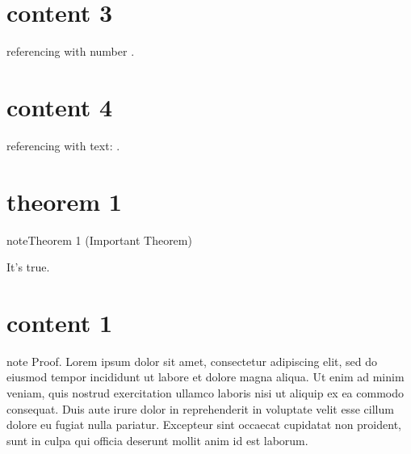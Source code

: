 \sphinxstepscope


\chapter{content 3}
\label{\detokenize{algorithm/_algo_numbered_reference:content-3}}\label{\detokenize{algorithm/_algo_numbered_reference::doc}}
\sphinxAtStartPar
referencing with number {\hyperref[\detokenize{algorithm/_algo_labeled_titled_with_classname:test-algo-label}]{}}.

\sphinxstepscope


\chapter{content 4}
\label{\detokenize{algorithm/_algo_text_reference:content-4}}\label{\detokenize{algorithm/_algo_text_reference::doc}}
\sphinxAtStartPar
referencing with text: {\hyperref[\detokenize{algorithm/_algo_labeled_titled_with_classname:test-algo-label}]{}}.

\sphinxstepscope


\chapter{theorem 1}
\label{\detokenize{theorem/_theorems_with_number:theorem-1}}\label{\detokenize{theorem/_theorems_with_number::doc}}\label{theorem/_theorems_with_number:theorem-one}
\begin{sphinxadmonition}{note}{Theorem 1 (Important Theorem)}



\sphinxAtStartPar
It’s true.
\end{sphinxadmonition}

\sphinxstepscope


\chapter{content 1}
\label{\detokenize{proof/_proof_with_classname:content-1}}\label{\detokenize{proof/_proof_with_classname::doc}}
\begin{sphinxadmonition}{note}
\sphinxAtStartPar
Proof. Lorem ipsum dolor sit amet, consectetur adipiscing elit, sed do eiusmod tempor incididunt ut labore et dolore magna aliqua. Ut enim ad minim veniam, quis nostrud exercitation ullamco laboris nisi ut aliquip ex ea commodo consequat. Duis aute irure dolor in reprehenderit in voluptate velit esse cillum dolore eu fugiat nulla pariatur. Excepteur sint occaecat cupidatat non proident, sunt in culpa qui officia deserunt mollit anim id est laborum.
\end{sphinxadmonition}

